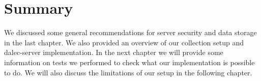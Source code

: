 %
\section{Summary}
We discussed some general recommendations for server security and data storage in the last chapter. We also provided an overview of our collection setup and dalec-server implementation. In the next chapter we will provide some information on tests we performed to check what our implementation is possible to do. We will also discuss the limitations of our setup in the following chapter.

%
